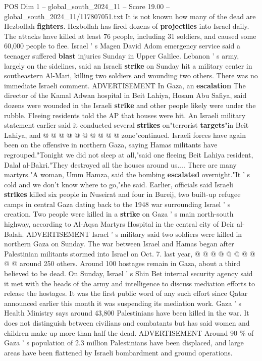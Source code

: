 \begin{textsample}{POS Dim 1 – global\_south\_2024\_11 – Score 19.00 – global\_south\_2024\_11/117807051.txt}
It is not known how many of the dead are Hezbollah \textbf{fighters}.
Hezbollah has fired dozens of \textbf{projectiles} into Israel daily.
The attacks have killed at least 76 people, including 31 soldiers, and caused some 60,000 people to flee.
Israel ' s Magen David Adom emergency service said a teenager suffered \textbf{blast} injuries Sunday in Upper Galilee.
Lebanon ' s army, largely on the sidelines, said an Israeli \textbf{strike} on Sunday hit a military center in southeastern Al-Mari, killing two soldiers and wounding two others.
There was no immediate Israeli comment.
ADVERTISEMENT In Gaza, an \textbf{escalation} The director of the Kamal Adwan hospital in Beit Lahiya, Hosam Abu Safiya, said dozens were wounded in the Israeli \textbf{strike} and other people likely were under the rubble.
Fleeing residents told the AP that houses were hit.
An Israeli military statement earlier said it conducted several \textbf{strikes} on"terrorist \textbf{targets}"in Beit Lahiya, and @ @ @ @ @ @ @ @ @ @ zone"continued.
Israeli forces have again been on the offensive in northern Gaza, saying Hamas militants have regrouped."Tonight we did not sleep at all,"said one fleeing Beit Lahiya resident, Dalal al-Bakri."They destroyed all the houses around us....
There are many martyrs."A woman, Umm Hamza, said the bombing \textbf{escalated} overnight."It ' s cold and we don't know where to go,"she said.
Earlier, officials said Israeli \textbf{strikes} killed six people in Nuseirat and four in Bureij, two built-up refugee camps in central Gaza dating back to the 1948 war surrounding Israel ' s creation.
Two people were killed in a \textbf{strike} on Gaza ' s main north-south highway, according to Al-Aqsa Martyrs Hospital in the central city of Deir al-Balah.
ADVERTISEMENT Israel ' s military said two soldiers were killed in northern Gaza on Sunday.
The war between Israel and Hamas began after Palestinian militants stormed into Israel on Oct. 7. last year, @ @ @ @ @ @ @ @ @ @ around 250 others.
Around 100 hostages remain in Gaza, about a third believed to be dead.
On Sunday, Israel ' s Shin Bet internal security agency said it met with the heads of the army and intelligence to discuss mediation efforts to release the hostages.
It was the first public word of any such effort since Qatar announced earlier this month it was suspending its mediation work.
Gaza ' s Health Ministry says around 43,800 Palestinians have been killed in the war.
It does not distinguish between civilians and combatants but has said women and children make up more than half the dead.
ADVERTISEMENT Around 90 \% of Gaza ' s population of 2.3 million Palestinians have been displaced, and large areas have been flattened by Israeli bombardment and ground operations.

\end{textsample}
